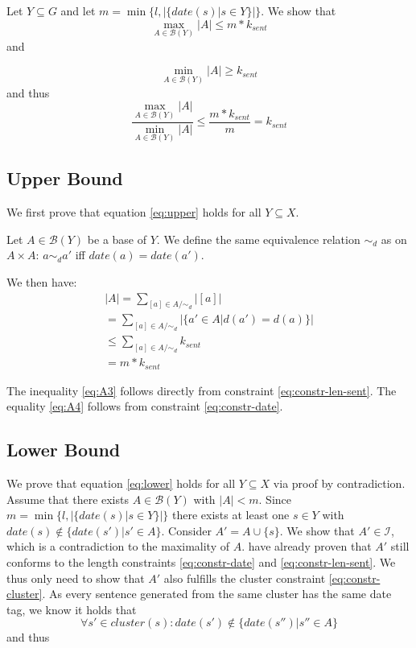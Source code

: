 \documentclass[a4paper,BCOR=10mm]{report}
\numberwithin{lemma}{chapter}
\numberwithin{definition}{chapter}
\begin{document}
\begin{appendices}
Let $Y \subseteq G$ and let $m = \min \{ l, |\{\mathit{date}(s) | s \in Y\}| \}$.
We show that 
\begin{equation}
\max_{A \in \mathcal{B}(Y)} |A| \leq m * k_{sent} \label{eq:upper}
\end{equation}
 and

\begin{equation}
\min_{A \in \mathcal{B}(Y)} |A| \geq k_{sent} \label{eq:lower}
\end{equation}
and thus 
\begin{equation}
\frac{\max_{A \in \mathcal{B}(Y)} |A|}{\min_{A \in \mathcal{B}(Y)} |A|}
\leq \frac{m * k_{sent}}{m} = k_{sent}    
\end{equation}

\subsection{Upper Bound} \label{sec:cluster-upper-bound}

We first prove that equation \ref{eq:upper} holds for all $Y \subseteq X$.

Let $A \in \mathcal{B}(Y)$ be a base of $Y$. We define the same equivalence relation $\sim_d$ as \citeauthor{markert} on $A \times A$:
$a \sim_d a'$ iff $\mathit{date}(a) = \mathit{date}(a')$.

We then have:
\begin{align}
|A| = \sum_{[a] \in A/\sim_d} |[a]| \\
    = \sum_{[a] \in A/\sim_d} |\{ a' \in A | d(a') = d(a) \}| \label{eq:A2} \\
    \leq \sum_{[a] \in A/\sim_d} k_{sent} \label{eq:A3} \\
    = m * k_{sent} \label{eq:A4}
\end{align}

The inequality \ref{eq:A3} follows directly from constraint \ref{eq:constr-len-sent}.
The equality \ref{eq:A4} follows from constraint \ref{eq:constr-date}.


\subsection{Lower Bound} \label{sec:proof-date-lower}

We prove that equation \ref{eq:lower} holds for all $Y \subseteq X$ via proof by contradiction.
Assume that there exists $A \in \mathcal{B}(Y)$ with $|A| < m$.
Since $m = \min \{ l, |\{\mathit{date}(s) | s \in Y\}| \}$ there exists at least one $s \in Y$ with $\mathit{date}(s) \not\in \{\mathit{date}(s') | s' \in A\}$.
Consider $A' = A \cup \{ s \}$. We show that $A' \in \mathcal{I}$, which is a contradiction to the maximality of $A$. \citet{markert} have already proven that $A'$ still conforms to the length constraints \ref{eq:constr-date} and \ref{eq:constr-len-sent}.
We thus only need to show that $A'$ also fulfills the cluster constraint \ref{eq:constr-cluster}.
As every sentence generated from the same cluster has the same date tag, we know it holds that
\begin{equation}
\forall s' \in \mathit{cluster}(s): \mathit{date}(s') \not\in \{\mathit{date}(s'') | s'' \in A \}
\end{equation}
and thus


\end{appendices}
\end{document}
